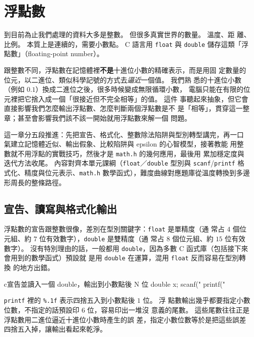 \chapter{浮點數}
\label{ch:floatingpointnumbers}

到目前為止我們處理的資料大多是整數。 但很多真實世界的數量。 溫度、距
離、比例。 本質上是連續的，需要小數點。 C 語言用 \texttt{float} 與
\texttt{double} 儲存這類「浮點數」（floating-point number）。

跟整數不同，浮點數在記憶體裡\textbf{不是}十進位小數的精確表示，而是用固
定數量的位元，以二進位、類似科學記號的方式去\emph{逼近}一個值。 我們熟
悉的十進位小數（例如 $0.1$）換成二進位之後，很多時候變成無限循環小數，
電腦只能在有限的位元裡把它捨入成一個「很接近但不完全相等」的值。 這件
事聽起來抽象，但它會直接影響我們怎麼輸出浮點數、怎麼判斷兩個浮點數是不
是「相等」，貫穿這一整章；甚至會影響我們該不該一開始就用浮點數來解一個
問題。

這一章分五段推進：先把宣告、格式化、整數除法陷阱與型別轉型講完，再一口
氣建立記憶體近似、輸出假象、比較陷阱與 epsilon 的心智模型，接著教能
用整數就不用浮點的實戰技巧，然後才是 \texttt{math.h} 的幾何應用，最後用
累加穩定度與迭代方法收尾。 內容對齊本單元課綱（\texttt{float}／\texttt{double}
型別與 \texttt{scanf}/\texttt{printf} 格式化、精度與位元表示、\texttt{math.h}
數學函式），難度曲線對應題庫從溫度轉換到多邊形周長的整條路徑。

\section{宣告、讀寫與格式化輸出}
\label{sec:float-declare-io}

浮點數的宣告跟整數很像，差別在型別關鍵字：\texttt{float} 是單精度（通
常占 $4$ 個位元組、約 $7$ 位有效數字），\texttt{double} 是雙精度（通
常占 $8$ 個位元組、約 $15$ 位有效數字）。 沒有特別理由的話，一般都用
\texttt{double}，因為多數 C 函式庫（包括接下來會用到的數學函式）預設就
是用 \texttt{double} 在運算，混用 \texttt{float} 反而容易在型別轉換
的地方出錯。

\begin{code}{c}{宣告並讀入一個 double，輸出到小數點後 N 位}
double x;
scanf("%
printf("%
\end{code}

\texttt{printf} 裡的 \texttt{\%.1f} 表示四捨五入到小數點後 $1$ 位。 浮
點數輸出幾乎都要指定小數位數，不指定的話預設印 $6$ 位，容易印出一堆沒
意義的尾數。 這些尾數往往正是浮點數用二進位逼近十進位小數時產生的誤
差，指定小數位數等於是把這些誤差四捨五入掉，讓輸出看起來乾淨。

